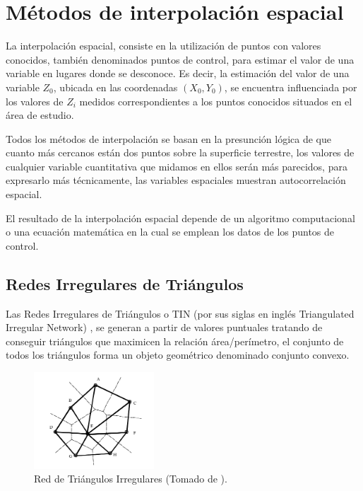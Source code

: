 \section{Métodos de interpolación espacial}
\label{sec:cap2-metodos-interpolacion}
La interpolación espacial, consiste en la utilización de puntos con valores conocidos, también
denominados puntos de control, para estimar el valor de una variable en lugares donde se
desconoce. Es decir, la estimación del valor de una variable $Z_{0}$, ubicada en las coordenadas
$(X_{0}, Y_{0})$, se encuentra influenciada por los valores de $Z_{i}$ medidos correspondientes a
los puntos conocidos situados en el área de estudio.

Todos los métodos de interpolación se basan en la presunción lógica de que cuanto más cercanos
están dos puntos sobre la superficie terrestre, los valores de cualquier variable cuantitativa que
midamos en ellos serán más parecidos, para expresarlo más técnicamente, las variables espaciales
muestran autocorrelación espacial\cite{fAlonsoSig2006}.

El resultado de la interpolación espacial depende de un algoritmo computacional o una ecuación
matemática en la cual se emplean los datos de los puntos de control\cite{NINO2011}.

\subsection {Redes Irregulares de Triángulos}
Las Redes Irregulares de Triángulos o TIN (por sus siglas en inglés Triangulated Irregular Network)
, se generan a partir de valores puntuales tratando de conseguir triángulos que maximicen la
relación área/perímetro, el conjunto de todos los triángulos forma un objeto geométrico
denominado conjunto convexo\cite{fAlonsoSig2006}.

\begin{figure}[!htbp]
\centering
\includegraphics[width=0.4\textwidth]{capitulo-2/graphics/TIN-cPachecoMDE2003.png}
\caption{\label{fig:sig-tin}Red de Triángulos Irregulares (Tomado de \cite{cPachecoMDE2003}).}
\end{figure}

